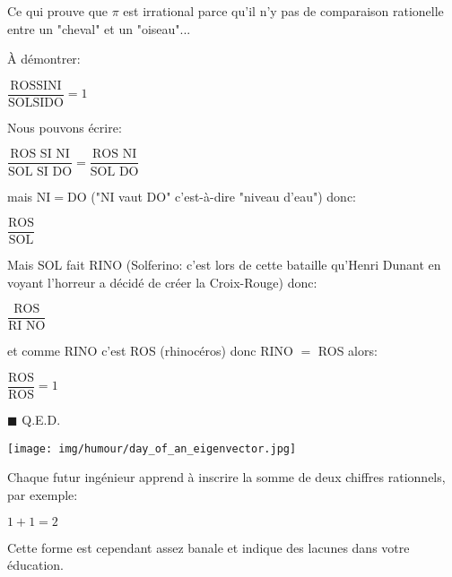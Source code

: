 	Ce qui prouve que $\pi$ est irrational parce qu'il n'y pas de comparaison rationelle entre un "cheval" et un "oiseau"... 
	
		\begin{center}\underline{\hspace{5 cm}}\end{center}

	\pagebreak
	À démontrer: 
	\begin{center}
	$\dfrac{\text{ROSSINI}}{\text{SOLSIDO}}=1$  
	\end{center} 
	
	Nous pouvons écrire:
	\begin{center}
	$\dfrac{\text{ROS SI NI}}{\text{SOL SI DO}}=\dfrac{\text{ROS NI}}{\text{SOL DO}}$  
	\end{center}
	
	mais NI$=$DO ("NI vaut DO" c'est-à-dire "niveau d'eau") donc: 
	\begin{center}
	$\dfrac{\text{ROS}}{\text{SOL}}$  
	\end{center}
	
	Mais SOL fait RINO (Solferino: c'est lors de cette bataille qu'Henri Dunant en voyant l'horreur a décidé de créer la Croix-Rouge) donc:
	\begin{center}
	$\dfrac{\text{ROS}}{\text{RI NO}}$  
	\end{center}
	
	et comme RINO c'est ROS (rhinocéros) donc RINO $=$ ROS alors:
	\begin{center}
	$\dfrac{\text{ROS}}{\text{ROS}}=1$  
	\end{center}

	\begin{flushright}
		$\blacksquare$  Q.E.D.
	\end{flushright}	

	\begin{center}\underline{\hspace{5 cm}}\end{center}
	\begin{center}
		\texttt{[image: img/humour/day\_of\_an\_eigenvector.jpg]}	
	\end{center}
	Chaque futur ingénieur apprend à inscrire la somme de deux chiffres rationnels, par exemple:
	\begin{center}
	$1+1=2$  
	\end{center}
	
	Cette forme est cependant assez banale et indique des lacunes dans votre éducation.

